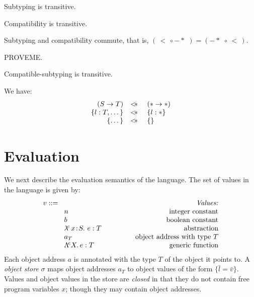 \documentclass{article}
\newcommand{\myclearpage}{}
\renewcommand{\myclearpage}{\clearpage}
\newcommand{\lam}[5]{\lambda\!^{#1}\,#2\!:\!#3.\,\,#5:#4}
\newcommand{\lamt}[2]{#1\rightarrow #2}
\newcommand{\dynamic}{\t{*}}
\newcommand{\Lam}[4]{\Lambda\!^{#1} #2.\,#3:#4}
\newcommand{\subtypeword}{\,<\,}
\newcommand{\subtype}[2]{#1 \subtypeword #2}
\newcommand{\compatible}[2]{#1 \leadsto #2}
\renewcommand{\compatible}[2]{#1 -\!\!\!*\,\, #2}
\newcommand{\comsubtype}[2]{#1 <\!\!\leadsto #2}
\renewcommand{\comsubtype}[2]{#1 <\!\!\!*\,\, #2}
\renewcommand{\t}[1]{{\tt #1}}
\newcommand{\objty}[1]{\{#1\}}
\newcommand{\objv}[1]{\{#1\}}
\begin{document}
 
\begin{lemma}
Subtyping is transitive.
\end{lemma}
\begin{lemma}
Compatibility is transitive.
\end{lemma}
\begin{lemma}
Subtyping and compatibility commute, that is, $(\subtype{}{}\circ \compatible{}{} )=( \compatible{}{}\circ \subtype{}{})$.
\end{lemma}
PROVEME.
\begin{lemma}
Compatible-subtyping is transitive.
\end{lemma}


We have:
\[
\begin{array}{rcl}
	(\lamt{S}{T})  		&\comsubtype{}{}&  (\lamt\dynamic\dynamic) \\
	\objty{l:T,\dots}		& \comsubtype{}{}&  \objty{l:\dynamic} \\
	\objty{\dots}	   	& \comsubtype{}{}&  \objty{} \\
\end{array}
\]

\myclearpage
\section{Evaluation}

We next describe the evaluation semantics of the language. 
The set of values in the language is given by:
\[
\begin{array}{llr}
	\mydefhead{v ::=\qquad\qquad\qquad\qquad\qquad}{Values:} 
	\mydefcase{n									}{integer constant} 
	\mydefcase{b									}{boolean constant} 
	\mydefcase{\lam{c}{x}{S}{T}{e} 				}{abstraction} 
	\mydefcase{a_T								}{object address with type $T$}
	\mydefcase{\Lam c X e T						}{generic function}
\end{array}
\]
Each object address $a$ is annotated with the type $T$ of the object it points to.
A \emph{object store} $\sigma$ maps object addresses $a_T$ to object values of the form $\objv{\bar{l}=\bar v}$.
Values and object values in the store are \emph{closed} in that they do not contain free program variables $x$;
though they may contain object addresses.
\end{document}
